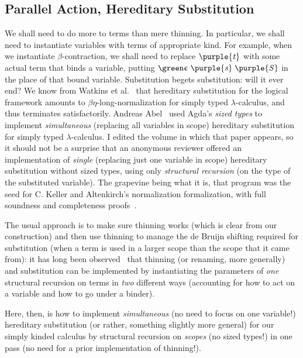 \documentclass[natbib]{article}
\newcommand{\V}[1]{\purple{\mathit{#1}}}
\begin{document}
\subsection{Parallel Action, Hereditary Substitution}

We shall need to do more to terms than mere thinning. In particular, we shall need to instantiate variables with terms of appropriate kind. For example, when we instantiate $\beta$-contraction, we shall need to replace $\V t$ with some actual term that binds a variable, putting
$\tyc\;\V s\;\V S$ in the place of that bound variable. Substitution begets substitution: will it ever end? We know from Watkins et al.~\cite{DBLP:conf/types/WatkinsCPW03} that hereditary substitution for the logical framework amounts to $\beta\eta$-long-normalization for simply typed $\lambda$-calculus, and thus terminates satisfactorily. Andreas Abel~\cite{DBLP:conf/mpc/000106} used Agda's \emph{sized types}
to implement \emph{simultaneous} (replacing all variables in scope) hereditary substitution for simply typed $\lambda$-calculus. I edited the volume in which that paper appears, so it should not be a surprise that an anonymous reviewer offered an implementation of \emph{single} (replacing just one variable in scope) hereditary substitution without sized types, using only \emph{structural recursion} (on the type of the substituted variable). The grapevine being what it is, that program was the seed for C. Keller and Altenkirch's normalization formalization, with full soundness and completeness proofs~\cite{DBLP:conf/icfp/KellerA10}.

The usual approach is to make sure thinning works (which is clear from our construction) and then use thinning to manage the de Bruijn shifting required for substitution (when a term is used in a larger scope than the scope that it came from): it has long been observed~\cite{Goguen97candidatesfor,DBLP:phd/ethos/McBride00} that thinning (or renaming, more generally) and substitution can be implemented by instantiating the parameters of \emph{one} structural recursion on terms in \emph{two} different ways (accounting for how to act on a variable and how to go under a binder).

Here, then, is how to implement \emph{simultaneous} (no need to focus on one variable!) hereditary substitution (or rather, something slightly more general) for our simply kinded calculus by structural recursion on \emph{scopes} (no sized types!) in one pass (no need for a prior implementation of thinning!).
\newcommand{\act}[3]{#1 \left[#2\right> #3}
\end{document}
